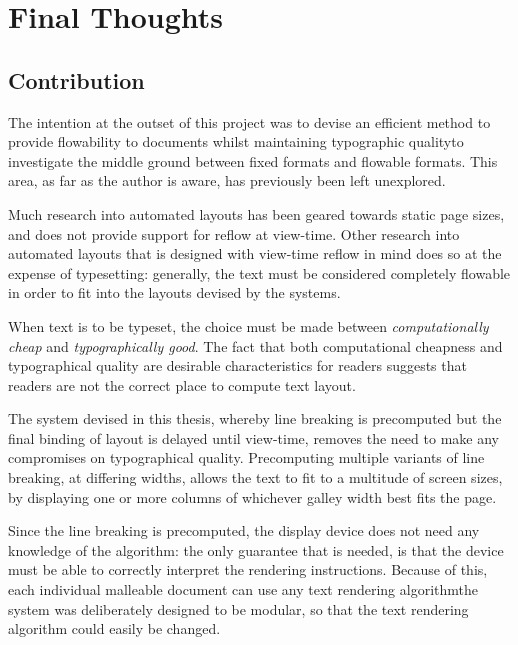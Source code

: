 \chapter{Final Thoughts}\label{ch:conclusions}

\section{Contribution}
The intention at the outset of this project was to devise an efficient method to provide flowability to documents whilst maintaining typographic quality\ed to investigate the middle ground between fixed formats and flowable formats. This area, as far as the author is aware, has previously been left unexplored.

Much research into automated layouts\hspace{0pt}\cite{Johari1996,Goldenberg2002,Purvis2003,Balinsky2009} has been geared towards static page sizes, and does not provide support for reflow at view-time. Other research into automated layouts that is designed with view-time reflow in mind\hspace{0pt}\cite{Jacobs2003,Schrier2008} does so at the expense of typesetting: generally, the text must be considered completely flowable in order to fit into the layouts devised by the systems.

When text is to be typeset, the choice must be made between \emph{computationally cheap} and \emph{typographically good}. The fact that both computational cheapness and typographical quality are desirable characteristics for \ebook{} readers suggests that \ebook{} readers are not the correct place to compute text layout.

The system devised in this thesis, whereby line breaking is precomputed but the final binding of layout is delayed until view-time, removes the need to make any compromises on typographical quality. Precomputing multiple variants of line breaking, at differing widths, allows the text to fit to a multitude of screen sizes, by displaying one or more columns of whichever galley width best fits the page.

Since the line breaking is precomputed, the display device does not need any knowledge of the algorithm: the only guarantee that is needed, is that the device must be able to correctly interpret the rendering instructions. Because of this, each individual malleable document can use any text rendering algorithm\ed the system was deliberately designed to be modular, so that the text rendering algorithm could easily be changed.

